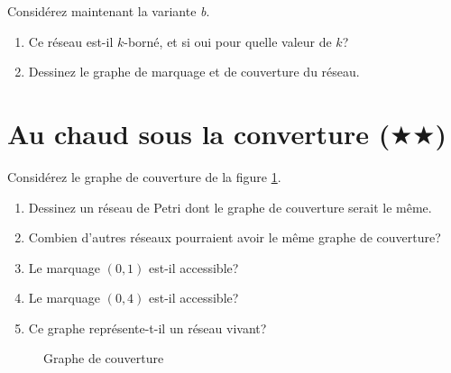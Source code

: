 \documentclass[a4paper, titlepage]{article}
\begin{document}
Considérez maintenant la variante \emph{b}.

\begin{enumerate}
  \item Ce réseau est-il $k$-borné, et si oui pour quelle valeur de $k$?
  \item Dessinez le graphe de marquage et de couverture du réseau.
\end{enumerate}

\section{Au chaud sous la converture ($\bigstar\bigstar$)}

Considérez le graphe de couverture de la figure \ref{fig:couverture}.

\begin{enumerate}
  \item Dessinez un réseau de Petri dont le graphe de couverture serait le même.
  \item Combien d'autres réseaux pourraient avoir le même graphe de couverture?
  \item Le marquage $(0,1)$ est-il accessible?
  \item Le marquage $(0,4)$ est-il accessible?
  \item Ce graphe représente-t-il un réseau vivant?
\end{enumerate}

\begin{figure}[ht]
	\centering
	\caption{Graphe de couverture}
	\label{fig:couverture}
\end{figure}
\end{document}
